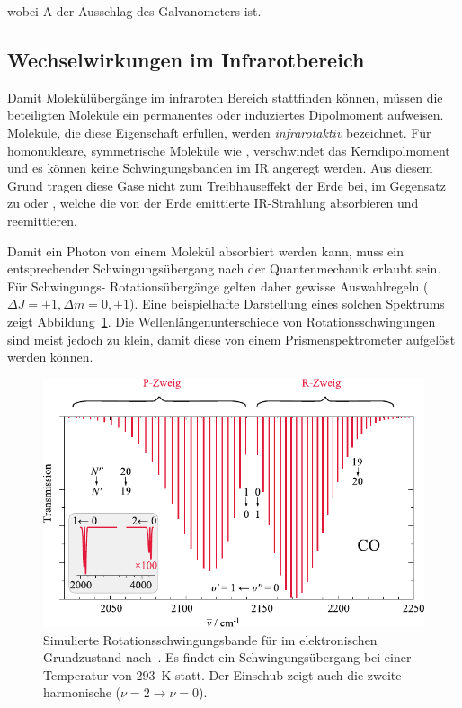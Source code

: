 \documentclass[a4paper,twoside,final]{article}
\begin{document}
wobei A der Ausschlag des Galvanometers ist.

\subsection{Wechselwirkungen im Infrarotbereich}\label{sec:Wechselwirkungen}

Damit Molekülübergänge im infraroten Bereich stattfinden können, müssen die beteiligten Moleküle ein permanentes oder induziertes Dipolmoment aufweisen. Moleküle, die diese Eigenschaft erfüllen, werden \emph{infrarotaktiv} bezeichnet. Für homonukleare, symmetrische Moleküle wie ,  verschwindet das Kerndipolmoment und es können keine Schwingungsbanden im IR angeregt werden. Aus diesem Grund tragen diese Gase nicht zum Treibhauseffekt der Erde bei, im Gegensatz zu  oder , welche die von der Erde emittierte IR-Strahlung absorbieren und reemittieren.

Damit ein Photon von einem Molekül absorbiert werden kann, muss ein entsprechender Schwingungsübergang nach der Quantenmechanik erlaubt sein. Für Schwingungs- Rotationsübergänge gelten daher gewisse Auswahlregeln ($\Delta J = \pm 1, \Delta m = 0, \pm 1$). Eine beispielhafte Darstellung eines solchen Spektrums zeigt Abbildung~\ref{Rotationsschwingung}. Die Wellenlängenunterschiede von Rotationsschwingungen sind meist jedoch zu klein, damit diese von einem Prismenspektrometer aufgelöst werden können.

\begin{figure}[htp]
  \centering
  \includegraphics{Bilder/Rotationsschwingung.pdf}
  \caption{Simulierte Rotationsschwingungsbande für  im elektronischen Grundzustand nach~\cite{Hertel}. Es findet ein Schwingungsübergang bei einer Temperatur von \SI{293}{\kelvin} statt. Der Einschub zeigt auch die zweite harmonische ($\nu=2 \to \nu=0$).}
  \label{Rotationsschwingung}
\end{figure}
\end{document}
